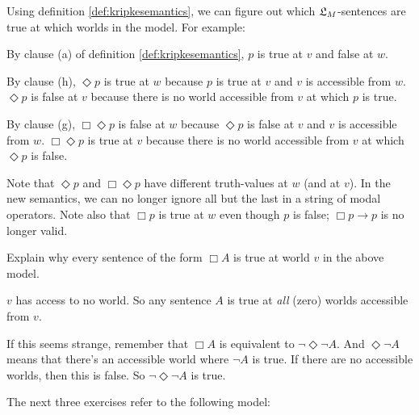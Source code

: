\begin{center}
\end{center}
%
Using definition \ref{def:kripkesemantics}, we can figure out which $\mathfrak{L}_M$-sentences
are true at which worlds in the model. For example:

\begin{itemize*}
  \item By clause (a) of definition \ref{def:kripkesemantics}, $p$ is true at
  $v$ and false at $w$.
  \item By clause (h), $\Diamond p$ is true at $w$ because $p$ is true at $v$
  and $v$ is accessible from $w$. $\Diamond p$ is false at $v$ because there is
  no world accessible from $v$ at which $p$ is true.
  \item By clause (g), $\Box\Diamond p$ is false at $w$ because $\Diamond p$ is
  false at $v$ and $v$ is accessible from $w$. $\Box\Diamond p$ is true at $v$
  because there is no world accessible from $v$ at which $\Diamond p$ is false.
\end{itemize*}
%
Note that $\Diamond p$ and $\Box \Diamond p$ have different truth-values at $w$
(and at $v$). In the new semantics, we can no longer ignore all but the last in a
string of modal operators. Note also that $\Box p$ is true at $w$ even though
$p$ is false; $\Box p \to p$ is no longer valid.

\begin{exercise}
  Explain why every sentence of the form $\Box A$ is true at world $v$
  in the above model.
\end{exercise}
\begin{solution}
  $v$ has access to no world. So any sentence $A$ is true at
  \emph{all} (zero) worlds accessible from $v$.

  If this seems strange, remember that $\Box A$ is equivalent to
  $\neg \Diamond \neg A$. And $\Diamond \neg A$ means that there's an
  accessible world where $\neg A$ is true. If there are no accessible
  worlds, then this is false. So $\neg \Diamond \neg A$ is true.
\end{solution}

The next three exercises refer to the following model:
%
\begin{center}
\end{center}

